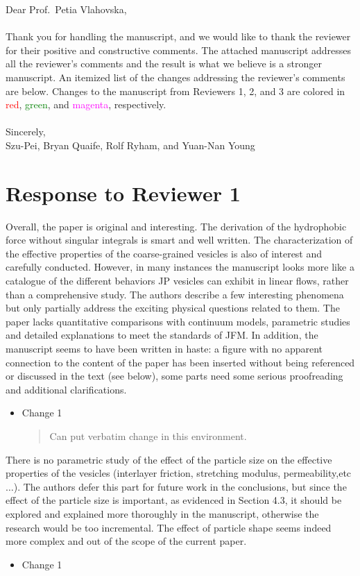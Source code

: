 \documentclass[11pt]{article}
\newcommand{\comment}[1]{{\color{blue} #1}}
\begin{document}
\noindent
Dear Prof.~Petia Vlahovska,
\\ \\
\noindent
Thank you for handling the manuscript, and we would like to thank the
reviewer for their positive and constructive comments. The attached
manuscript addresses all the reviewer's comments and the result is what
we believe is a stronger manuscript. An itemized list of the changes
addressing the reviewer's comments are below. Changes to the manuscript
from Reviewers 1, 2, and 3 are colored in \textcolor{red}{red},
\textcolor{green}{green}, and \textcolor{magenta}{magenta},
respectively. \\ \\
\noindent
Sincerely,
\\
\noindent
Szu-Pei, Bryan Quaife, Rolf Ryham, and Yuan-Nan Young

\section*{Response to Reviewer 1}
\noindent
\comment{Overall, the paper is original and interesting. The derivation
of the hydrophobic force without singular integrals is smart and well
written. The characterization of the effective properties of the
coarse-grained vesicles is also of interest and carefully conducted.
However, in many instances the manuscript looks more like a catalogue of
the different behaviors JP vesicles can exhibit in linear flows, rather
than a comprehensive study. The authors describe a few interesting
phenomena but only partially address the exciting physical questions
related to them. The paper lacks quantitative comparisons with continuum
models, parametric studies and detailed explanations to meet the
standards of JFM. In addition, the manuscript seems to have been written
in haste: a figure with no apparent connection to the content of the
paper has been inserted without being referenced or discussed in the
text (see below), some parts need some serious proofreading and
additional clarifications.}
\begin{itemize}
  \item Change 1
  \begin{quotation}
    \noindent
    Can put verbatim change in this environment.
  \end{quotation}
\end{itemize}

\noindent
\comment{There is no parametric study of the effect of the particle size
on the effective properties of the vesicles (interlayer friction,
stretching modulus, permeability,etc$\ldots$). The authors defer this
part for future work in the conclusions, but since the effect of the
particle size is important, as evidenced in Section 4.3, it should be
explored and explained more thoroughly in the manuscript, otherwise the
research would be too incremental. The effect of particle shape seems
indeed more complex and out of the scope of the current paper.}
\begin{itemize}
  \item Change 1 
\end{itemize}
\end{document}
